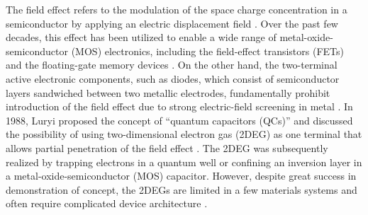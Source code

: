 \documentclass[journal=nalefd]{achemso}
\begin{document}
\newpage
The field effect refers to the modulation of the space charge concentration in a semiconductor by applying an electric displacement field \cite{Sze2006Mosfets}.
Over the past few decades, this effect has been utilized to enable a wide range of metal-oxide-semiconductor (MOS) electronics, including the field-effect transistors (FETs) and the floating-gate memory devices \cite{Sze2006Mosfets}.
On the other hand, the two-terminal active electronic components, such as diodes, which consist of semiconductor layers sandwiched between two metallic electrodes, fundamentally prohibit introduction of the field effect due to strong electric-field screening in metal \cite{ehrenreich2001solid}. 
In 1988, Luryi proposed the concept of ``quantum capacitors (QCs)'' and discussed the possibility of using two-dimensional electron gas (2DEG) as one terminal that allows partial penetration of the field effect \cite{Luryi1988Quantum}.
The 2DEG was subsequently realized by trapping electrons in a quantum well \cite{Davies1997Physics} or confining an inversion layer in a metal-oxide-semiconductor (MOS) capacitor\cite{Sze2006Mosfets}.
However, despite great success in demonstration of concept, the 2DEGs are limited in a few materials systems and often require complicated device architecture \cite{stormer1979two}.
\end{document}
